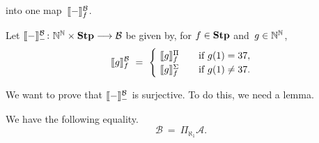 \documentclass[main.tex]{subfiles}
\begin{document}
into one map~$\decode{-}^\mathcal{B}_f$.
\begin{dfn}
Let
$\decode{-}^{\mathcal{B}}_{-}\colon 
  \N^\N\times \Stump \longrightarrow \mathcal{B}$
be given by, for $f\in\mathbf{Stp}$ and~$g\in\mathbb{N}^{\mathbb{N}}$,
\begin{equation}
\label{eq:decode-Borel}
\decode{g}^{\mathcal{B}}_f \ = \ 
\begin{cases}
\  \decode{g}^{\Pi}_f  \quad
& \text{if $g(1)= 37$},\\

\ \decode{g}^{\Sigma}_f
& \text{if $g(1)\neq 37$}.
\end{cases}
\end{equation}
\end{dfn}
We want to prove that $\decode{-}_{-}^\mathcal{B}$
is surjective. 
To do this,
we need a lemma.
\begin{lem}
\label{L:Borel-aleph1}
We have the following equality.
\begin{equation}
\label{eq:Borel-aleph1}
\mathcal{B} \ =\  \Pi_{\aleph_1} \mathcal{A}.
\end{equation}
\end{lem}
\end{document}
